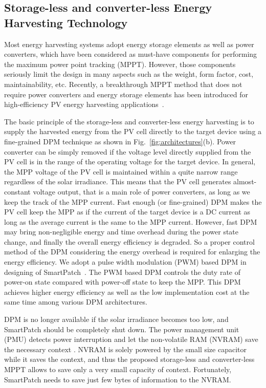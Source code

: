 \documentclass[journal]{IEEEtran}
\begin{document}
\subsection{Storage-less and converter-less Energy Harvesting Technology}
Most energy harvesting systems adopt energy storage elements as well as power converters, which have been considered as must-have components for performing the maximum power point tracking (MPPT).
However, those components seriously limit the design in many aspects such as the weight, form factor, cost, maintainability, etc.
Recently, a breakthrough MPPT method that does not require power converters and energy storage elements has been introduced for high-efficiency PV energy harvesting applications~\cite{Wang:ASPDAC14}.

The basic principle of the storage-less and converter-less energy harvesting is to supply the harvested energy from the PV cell directly to the target device using a fine-grained DPM technique as shown in Fig.~\ref{fig:architectures}(b).
Power converter can be simply removed if the voltage level directly supplied from the PV cell is in the range of the operating voltage for the target device.
In general, the MPP voltage of the PV cell is maintained within a quite narrow range regardless of the solar irradiance.
This means that the PV cell generates almost-constant voltage output, that is a main role of power converters, as long as we keep the track of the MPP current.
Fast enough (or fine-grained) DPM makes the PV cell keep the MPP as if the current of the target device is a DC current as long as the average current is the same to the MPP current.
However, fast DPM may bring non-negligible energy and time overhead during the power state change, and finally the overall energy efficiency is degraded.
So a proper control method of the DPM considering the energy overhead is required for enlarging the energy efficiency.
We adopt a pulse width modulation (PWM) based DPM in designing of SmartPatch~\cite{Lee:ASPDAC15}.
The PWM based DPM controls the duty rate of power-on state compared with power-off state to keep the MPP.
This DPM achieves higher energy efficiency as well as the low implementation cost at the same time among various DPM architectures.

DPM is no longer available if the solar irradiance becomes too low, and SmartPatch should be completely shut down. The power management unit (PMU) detects power interruption and let the non-volatile RAM (NVRAM) save the necessary context \cite{Balsamo:TCAD16}. NVRAM is solely powered by the small size capacitor while it saves the context, and thus the proposed storage-less and converter-less MPPT allows to save only a very small capacity of context. Fortunately, SmartPatch needs to save just few bytes of information to the NVRAM.
\end{document}
